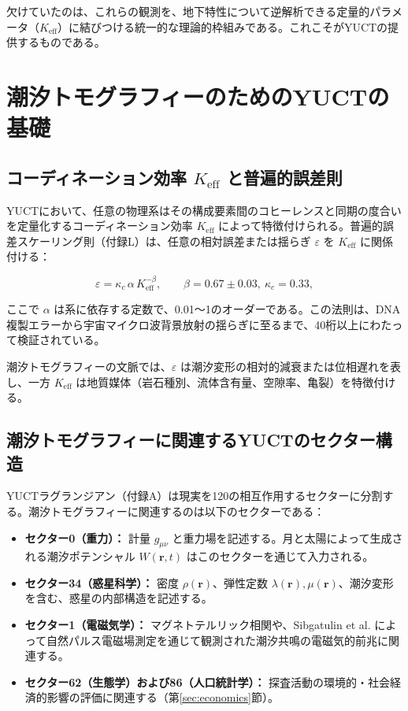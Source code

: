 \documentclass[12pt,a4paper]{article}
\theoremstyle{remark}
\newcommand{\Keff}{K_{\mathrm{eff}}}
\newcommand{\kappac}{\kappa_c}
\newcommand{\eps}{\varepsilon}
\begin{document}
	欠けていたのは、これらの観測を、地下特性について逆解析できる定量的パラメータ（\(\Keff\)）に結びつける統一的な理論的枠組みである。これこそがYUCTの提供するものである。
	
	\section{潮汐トモグラフィーのためのYUCTの基礎}
	\label{sec:yuct-foundations}
	
	\subsection{コーディネーション効率 \(\Keff\) と普遍的誤差則}
	
	YUCTにおいて、任意の物理系はその構成要素間のコヒーレンスと同期の度合いを定量化するコーディネーション効率 \(\Keff\) によって特徴付けられる。普遍的誤差スケーリング則（付録L）は、任意の相対誤差または揺らぎ \(\eps\) を \(\Keff\) に関係付ける：
	
	\begin{equation}
		\eps = \kappac \, \alpha \, \Keff^{-\beta}, \qquad \beta = 0.67 \pm 0.03,\ \kappac = 0.33,
		\label{eq:universal-scaling}
	\end{equation}
	
	ここで \(\alpha\) は系に依存する定数で、0.01～1のオーダーである。この法則は、DNA複製エラーから宇宙マイクロ波背景放射の揺らぎに至るまで、40桁以上にわたって検証されている。
	
	潮汐トモグラフィーの文脈では、\(\eps\) は潮汐変形の相対的減衰または位相遅れを表し、一方 \(\Keff\) は地質媒体（岩石種別、流体含有量、空隙率、亀裂）を特徴付ける。
	
	\subsection{潮汐トモグラフィーに関連するYUCTのセクター構造}
	
	YUCTラグランジアン（付録A）は現実を120の相互作用するセクターに分割する。潮汐トモグラフィーに関連するのは以下のセクターである：
	
	\begin{itemize}
		\item \textbf{セクター0（重力）：} 計量 \(g_{\mu\nu}\) と重力場を記述する。月と太陽によって生成される潮汐ポテンシャル \(W(\mathbf{r},t)\) はこのセクターを通じて入力される。
		\item \textbf{セクター34（惑星科学）：} 密度 \(\rho(\mathbf{r})\)、弾性定数 \(\lambda(\mathbf{r}), \mu(\mathbf{r})\)、潮汐変形を含む、惑星の内部構造を記述する。
		\item \textbf{セクター1（電磁気学）：} マグネトテルリック相関や、Sibgatulin et al. \cite{Sibgatulin2014} によって自然パルス電磁場測定を通じて観測された潮汐共鳴の電磁気的前兆に関連する。
		\item \textbf{セクター62（生態学）および86（人口統計学）：} 探査活動の環境的・社会経済的影響の評価に関連する（第\ref{sec:economics}節）。
	\end{itemize}
	
\end{document}
